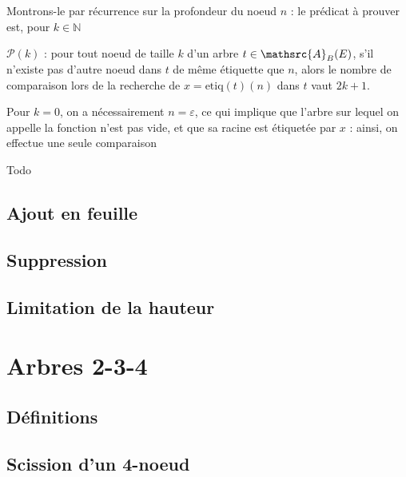 \documentclass{scrartcl}
\begin{document}
			\begin{demo}
				\item Montrons-le par récurrence sur la profondeur du noeud $n$ : le prédicat à prouver est, pour $k \in \mathbb{N}$
				\begin{center}
					$\mathcal{P}(k)$ : pour tout noeud de taille $k$ d'un arbre $t \in \mathsrc{A}_B(E)$, s'il n'existe pas d'autre noeud dans $t$ de même étiquette que $n$,
					alors le nombre de comparaison lors de la recherche de $x = \mathrm{etiq}(t)(n)$ dans $t$ vaut $2k+1$.
				\end{center}
				\item Pour $k=0$, on a nécessairement $n = \varepsilon$, ce qui implique que l'arbre sur lequel on appelle la fonction n'est pas vide,
					et que sa racine est étiquetée par $x$ : ainsi, on effectue une seule comparaison
			\end{demo}

			\begin{demo}
				\item Todo
			\end{demo}

		\subsection{Ajout en feuille}
		\subsection{Suppression}
		\subsection{Limitation de la hauteur}

	\section{Arbres 2-3-4}
		\subsection{Définitions}
		\subsection{Scission d'un 4-noeud}
\end{document}
